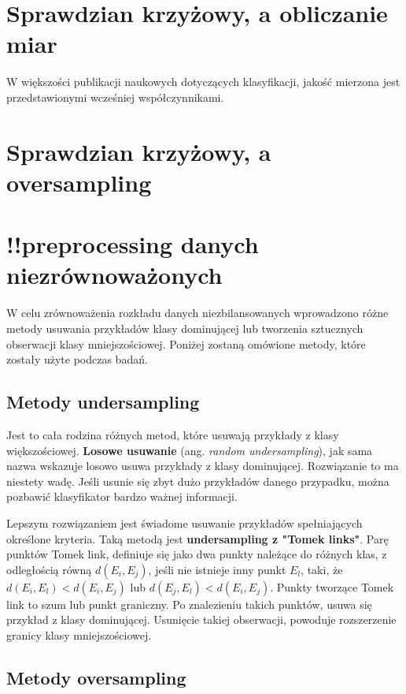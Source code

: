 \section{Sprawdzian krzyżowy, a obliczanie miar}
W większości publikacji naukowych dotyczących klasyfikacji, jakość mierzona jest przedstawionymi wcześniej współczynnikami. 
\section{Sprawdzian krzyżowy, a oversampling}


\section{!!preprocessing danych niezrównoważonych}
W celu zrównoważenia rozkładu danych niezbilansowanych wprowadzono różne metody usuwania przykładów klasy dominującej lub tworzenia sztucznych obserwacji klasy mniejszościowej. Poniżej zostaną omówione metody, które zostały użyte podczas badań.
\subsection{Metody undersampling}
Jest to cała rodzina różnych metod, które usuwają przykłady z klasy większościowej. \textbf{Losowe usuwanie} (ang. \textit{random undersampling}), jak sama nazwa wskazuje losowo usuwa przykłady z klasy dominującej. Rozwiązanie to ma niestety wadę. Jeśli usunie się zbyt dużo przykładów danego przypadku, można pozbawić klasyfikator bardzo ważnej informacji. \par
Lepszym rozwiązaniem jest świadome usuwanie przykładów spełniających określone kryteria. Taką metodą jest \textbf{undersampling z "Tomek links"}. Parę punktów Tomek link, definiuje się jako dwa punkty należące do różnych klas, z odległością równą $d(E_i,E_j)$, jeśli nie istnieje inny punkt $E_l$, taki, że $d(E_i,E_l) < d(E_i,E_j)$ lub $d(E_j,E_l) < d(E_i,E_j)$. Punkty tworzące Tomek link to szum lub punkt graniczny. Po znalezieniu takich punktów, usuwa się przykład z klasy dominującej. Usunięcie takiej obserwacji, powoduje rozszerzenie granicy klasy mniejszościowej. \par
{}

\subsection{Metody oversampling}



